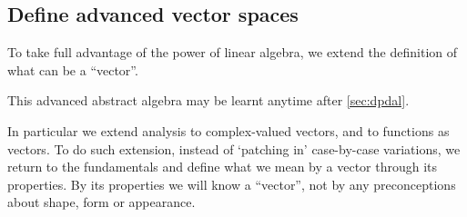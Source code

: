 \begin{draft}
\section{Define advanced vector spaces}
\label{sec:davsof}

\secttoc

\begin{comment}
axiomatic approach.  Rebuild the foundations.
Maybe \pooliv{Ch.6 and~7} \larsvii{Ch.5 and~8} \holti{Ch.10, \S11.4--5}
\end{comment}

To take full advantage of the power of linear algebra, we extend the definition of what can be a ``vector''.
\begin{aside}
This advanced abstract algebra may be learnt anytime after \cref{sec:dpdal}.
\end{aside}
In particular we extend analysis to complex-valued vectors, and to functions as vectors.
To do such extension, instead of `patching in' case-by-case variations, we return to the fundamentals and define what we mean by a vector through its properties.
By its properties we will know a ``vector'', not by any preconceptions about shape, form or appearance.



\end{draft}
